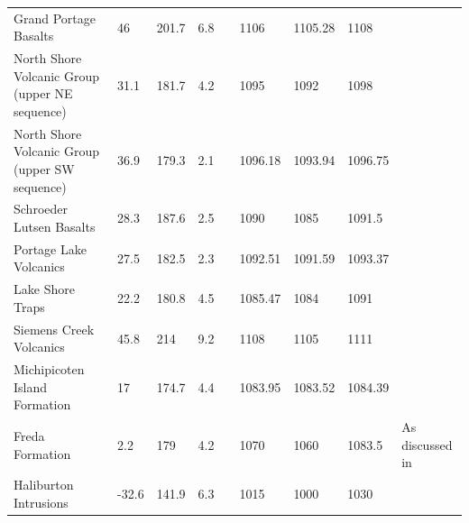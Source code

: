 \documentclass[11pt,letterpaper]{article}
\begin{document}
\begin{table}
\begin{scriptsize}
\begin{tabular}{p{4cm}lllp{4cm}lllp{4cm}}
Grand Portage Basalts                                      & 46       & 201.7    & 6.8  & \cite{Books1968a, Tauxe2009a}                                    & 1106       & 1105.28  & 1108     & \cite{Swanson-Hysell2019a}                         \\
North Shore Volcanic Group (upper NE   sequence)           & 31.1     & 181.7    & 4.2  & \cite{Books1972a, Tauxe2009a}                                    & 1095       & 1092     & 1098     & \cite{Davis1997a, Fairchild2017a}       \\
North Shore Volcanic Group (upper SW   sequence)           & 36.9     & 179.3    & 2.1  & \cite{Tauxe2009a, Swanson-Hysell2019a}                   & 1096.18    & 1093.94  & 1096.75  & \cite{Swanson-Hysell2019a}                        \\
Schroeder Lutsen Basalts                                   & 28.3     & 187.6    & 2.5  & \cite{Books1972a, Tauxe2009a, Fairchild2017a}            & 1090       & 1085     & 1091.5   & \cite{Fairchild2017a}                               \\
Portage Lake Volcanics                                     & 27.5     & 182.5    & 2.3  & \cite{Books1972a, Hnat2006a}                                         & 1092.51    & 1091.59  & 1093.37  & \cite{Swanson-Hysell2019a}                    \\
Lake Shore Traps                                           & 22.2     & 180.8    & 4.5  & \cite{Diehl1994a}                                                     & 1085.47    & 1084     & 1091     & \cite{Fairchild2017a, Swanson-Hysell2019a}    \\
Siemens Creek Volcanics                                    & 45.8     & 214      & 9.2  & \cite{Palmer1986a}                                                 & 1108       & 1105     & 1111     & \cite{Davis1997a}                               \\
Michipicoten Island Formation                              & 17       & 174.7    & 4.4  & \cite{Palmer1987a, Fairchild2017a}                        & 1083.95    & 1083.52  & 1084.39  & \cite{Fairchild2017a}                           \\
Freda Formation                                            & 2.2      & 179      & 4.2  & \cite{Henry1977a}                                                     & 1070       & 1060     & 1083.5   & As discussed in \cite{Swanson-Hysell2019a}            \\
Haliburton Intrusions                                      & -32.6    & 141.9    & 6.3  & \cite{Warnock2000a}                          & 1015       & 1000     & 1030     & \cite{Warnock2000a}                                          \\

\end{tabular}
\end{scriptsize}
\end{table}
\end{document}
